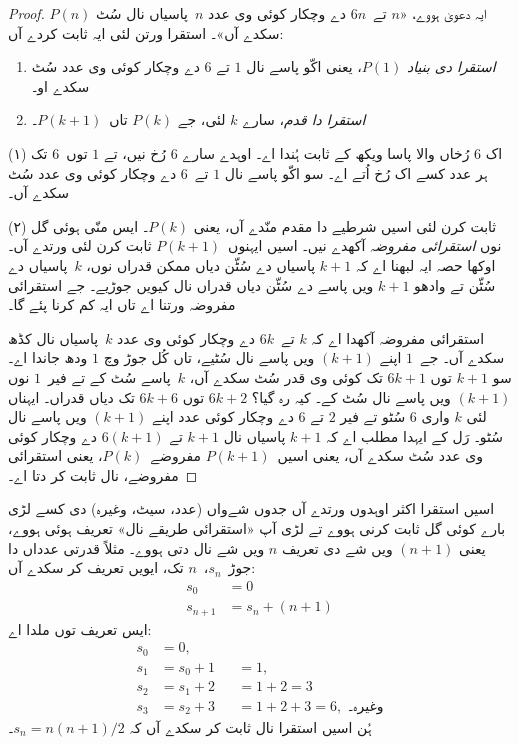 \documentclass[../../../include/open-logic-section]{subfiles}
\begin{document}
\begin{proof}
$P(n)$ ایہ دعویٰ ہووے، «$n$ تے~$6n$ دے وچکار کوئی وی عدد $n$~پاسیاں نال سُٹ سکدے آں»۔ استقرا ورتن لئی ایہ ثابت کردے آں:
\begin{enumerate}
\item \emph{استقرا دی بنیاد} $P(1)$، یعنی اکّو پاسے نال $1$ تے $6$ دے وچکار کوئی وی عدد سُٹ سکدے او۔
\item \emph{استقرا دا قدم}، سارے $k$ لئی، جے $P(k)$ تاں~$P(k+1)$۔
\end{enumerate}

(۱) اک $6$ رُخاں والا پاسا ویکھ کے ثابت ہُندا اے۔ اوہدے سارے 6 رُخ نیں، تے $1$ توں~$6$ تک ہر عدد کسے اک رُخ اُتے اے۔ سو اکّو پاسے نال $1$ تے~$6$ دے وچکار کوئی وی عدد سُٹ سکدے آں۔

(۲) ثابت کرن لئی اسیں شرطیے دا مقدم منّدے آں، یعنی $P(k)$۔ ایس منّی ہوئی گل نوں \emph{استقرائی مفروضہ} آکھدے نیں۔ اسیں ایہنوں~$P(k+1)$ ثابت کرن لئی ورتدے آں۔ اوکھا حصہ ایہ لبھنا اے کہ $k+1$ پاسیاں دے سُٹّن دیاں ممکن قدراں نوں، $k$~پاسیاں دے سُٹّن تے وادھو $k+1$ ویں پاسے دے سُٹّن دیاں قدراں نال کیویں جوڑیے۔ جے استقرائی مفروضہ ورتنا اے تاں ایہ کم کرنا پئے گا۔

استقرائی مفروضہ آکھدا اے کہ $k$ تے~$6k$ دے وچکار کوئی وی عدد $k$~پاسیاں نال کڈھ سکدے آں۔ جے~$1$ اپنے $(k+1)$ ویں پاسے نال سُٹیے، تاں کُل جوڑ وچ $1$ ودھ جاندا اے۔ سو $k+1$ توں $6k+1$ تک کوئی وی قدر سُٹ سکدے آں، $k$~پاسے سُٹ کے تے فیر~$1$ نوں $(k+1)$ ویں پاسے نال سُٹ کے۔ کیہ رہ گیا؟ $6k+2$ توں $6k+6$ تک دیاں قدراں۔ ایہناں لئی $k$ واری $6$ سُٹو تے فیر $2$ تے $6$ دے وچکار کوئی عدد اپنے $(k+1)$ ویں پاسے نال سُٹو۔ رَل کے ایہدا مطلب اے کہ $k+1$ پاسیاں نال $k+1$ تے $6(k+1)$ دے وچکار کوئی وی عدد سُٹ سکدے آں، یعنی اسیں~$P(k+1)$ مفروضے~$P(k)$، یعنی استقرائی مفروضے، نال ثابت کر دتا اے۔
\end{proof}

اسیں استقرا اکثر اوہدوں ورتدے آں جدوں شےواں (عدد، سیٹ، وغیرہ) دی کسے لڑی بارے کوئی گل ثابت کرنی ہووے تے لڑی آپ «استقرائی طریقے نال» تعریف ہوئی ہووے، یعنی $(n+1)$ ویں شے دی تعریف $n$ ویں شے نال دتی ہووے۔ مثلاً قدرتی عدداں دا جوڑ~$s_n$،~$n$ تک، ایویں تعریف کر سکدے آں:
\begin{align*}
  s_0 & = 0\\
  s_{n+1} & = s_n + (n+1)
\end{align*}
ایس تعریف توں ملدا اے:
\begin{align*}
  s_0 & = 0,\\
  s_1 & = s_0 + 1 && = 1,\\
  s_2 & = s_1 + 2 && = 1 + 2 = 3\\
  s_3 & = s_2 + 3 && = 1 + 2 + 3 = 6, \text{ وغیرہ۔}
\end{align*}
ہُن اسیں استقرا نال ثابت کر سکدے آں کہ $s_n = n(n+1)/2$۔
\end{document}

